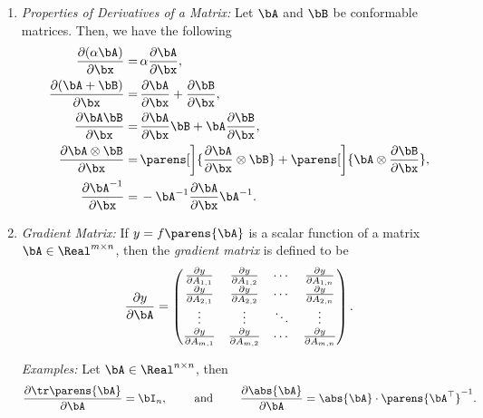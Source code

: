 \documentclass[12pt]{article}
\begin{document}
\begin{enumerate}[label=\textbf{\arabic*.}]
\begin{enumerate}
		\item \textit{Properties of Derivatives of a Matrix:} Let $\bA$ and $\bB$ be conformable matrices. Then, we have the following 
		\begin{align*}
			\frac{\partial (\alpha \bA)}{\partial \bx} = & \, \alpha \frac{\partial \bA}{\partial \bx}, \\ 
			\frac{\partial (\bA + \bB)}{\partial \bx} = & \, \frac{\partial \bA}{\partial \bx} + \frac{\partial \bB}{\partial \bx}, \\
			\frac{\partial \bA \bB}{\partial \bx} = & \, \frac{\partial \bA}{\partial \bx} \bB +  \bA \frac{\partial \bB}{\partial \bx}, \\ 
			\frac{\partial \bA \otimes \bB}{\partial \bx} = & \, \parens[\bigg]{\frac{\partial \bA}{\partial \bx} \otimes \bB} + \parens[\bigg]{\bA \otimes \frac{\partial \bB}{\partial \bx}}, \\ 
			\frac{\partial \bA^{-1}}{\partial \bx} = & \, -\bA^{-1} \frac{\partial \bA}{\partial \bx}\bA^{-1}. 
		\end{align*}
		
		\item \textit{Gradient Matrix:} If $y = f \parens{\bA}$ is a scalar function of a matrix $\bA \in \Real^{m \times n}$, then the \textit{gradient matrix} is defined to be 
		\begin{align*}
			\frac{\partial y}{\partial \bA} = \begin{pmatrix}
				\frac{\partial y}{\partial A_{1,1}} & \frac{\partial y}{\partial A_{1,2}} & \cdots & \frac{\partial y}{\partial A_{1,n}} \\ 
			\frac{\partial y}{\partial A_{2,1}} & \frac{\partial y}{\partial A_{2,2}} & \cdots & \frac{\partial y}{\partial A_{2,n}} \\ 
			\vdots & \vdots & \ddots & \vdots \\ 
			\frac{\partial y}{\partial A_{m,1}} & \frac{\partial y}{\partial A_{m,2}} & \cdots & \frac{\partial y}{\partial A_{m,n}} \\ 
			\end{pmatrix}. 
		\end{align*}
		
		\textit{Examples:} Let $\bA \in \Real^{n \times n}$, then 
		\begin{align*}
			\frac{\partial \tr \parens{\bA}}{\partial \bA} = \bI_n, \qquad \text{ and } \qquad \frac{\partial \abs{\bA}}{\partial \bA} = \abs{\bA} \cdot \parens{\bA^\top}^{-1}. 
		\end{align*}
		

\end{enumerate}
\end{enumerate}
\end{document}
